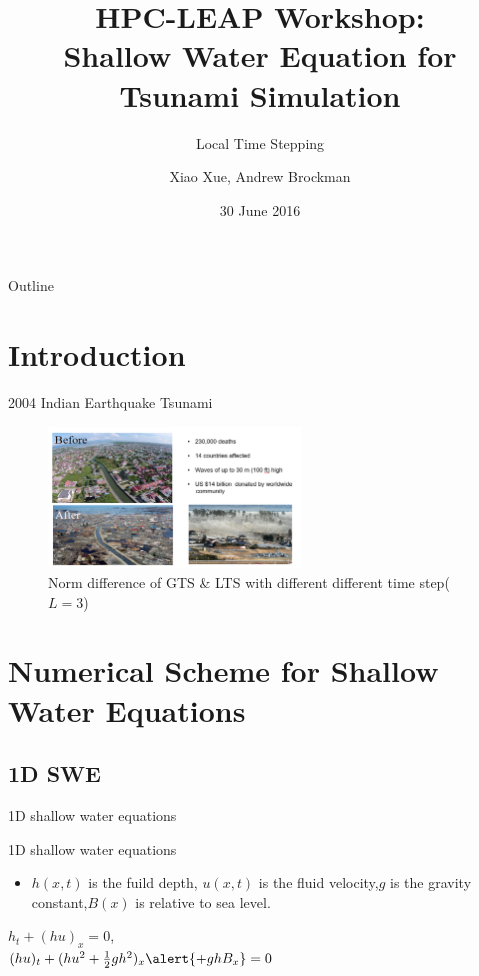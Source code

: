 \documentclass{beamer}
\title[Local Time Stepping]{HPC-LEAP Workshop:\\ Shallow Water Equation for Tsunami Simulation}
\subtitle{Local Time Stepping}
\author[Xiao Xue, Andrew Brockman]{Xiao Xue, Andrew Brockman}  %
\institute[]{HPC-LEAP Marie Curie Action}
\date{30 June 2016}
\begin{document}
\begin{frame}
  \titlepage
\end{frame}

\begin{frame}{Outline}
  \tableofcontents
\end{frame}

\section{Introduction}
\begin{frame}[t]{2004 Indian Earthquake Tsunami}
  \begin{figure}[p]
    \centering
    \includegraphics[width=0.6\textwidth]{tsunami}
    \caption{Norm difference of GTS \& LTS with different different time step($L=3$)}
    \label{fig:awesome_image}
\end{figure}
\end{frame}

\section{Numerical Scheme for Shallow Water Equations}
\subsection{1D SWE}
\begin{frame}{1D shallow water equations}

    \begin{block}{1D shallow water equations}
      \begin{itemize}
        \item $h(x,t)$ is the fuild depth, $u(x,t)$ is the fluid velocity,$g$ is the gravity constant,$B(x)$ is relative to sea level.
        
      \end{itemize}
      \begin{center}
      	$h_{t} + (hu)_{x} = 0$,\\
	    $(hu)_{t} + (hu^{2} + \frac{1}{2}gh^{2})_{x} \alert{+ ghB_{x}} =0$
	  \end{center}
    \end{block}
  
 
\end{frame}
\end{document}
